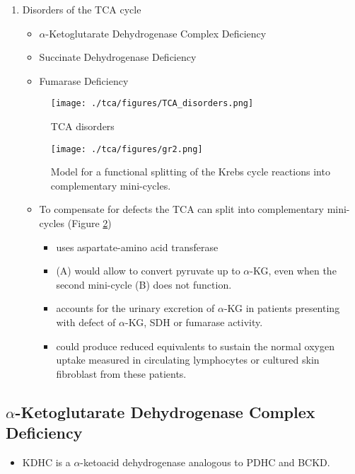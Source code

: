 \documentclass{scrartcl}
\begin{document}
\begin{enumerate}
\item Disorders of the TCA cycle
\label{sec:org99ee915}

\begin{itemize}
\item \(\alpha\)-Ketoglutarate Dehydrogenase Complex Deficiency
\item Succinate Dehydrogenase Deficiency
\item Fumarase Deficiency
\end{itemize}

\begin{figure}[htbp]
\centering
\texttt{[image: ./tca/figures/TCA\_disorders.png]}
\caption{\label{fig:org9dab98f}
TCA disorders}
\end{figure}


\begin{figure}[htbp]
\centering
\texttt{[image: ./tca/figures/gr2.png]}
\caption{\label{fig:org1c76d6c}
Model for a functional splitting of the Krebs cycle reactions into complementary mini-cycles.}
\end{figure}

\begin{itemize}
\item To compensate for defects the TCA can split into complementary
mini-cycles (Figure \ref{fig:org1c76d6c})
\begin{itemize}
\item uses aspartate-amino acid transferase
\item (A) would allow to convert pyruvate up to \(\alpha\)-KG, even when the second mini-cycle (B) does not function.
\item accounts for the urinary excretion of \(\alpha\)-KG in patients
presenting with defect of \(\alpha\)-KG, SDH or fumarase activity.
\item could produce reduced equivalents to sustain the normal oxygen
uptake measured in circulating lymphocytes or cultured skin
fibroblast from these patients.
\end{itemize}
\end{itemize}
\end{enumerate}

\subsection{\(\alpha\)-Ketoglutarate Dehydrogenase Complex Deficiency}
\label{sec:orgbd912dd}
\begin{itemize}
\item KDHC is a \(\alpha\)-ketoacid dehydrogenase analogous to PDHC and BCKD.
\end{itemize}
\end{document}
